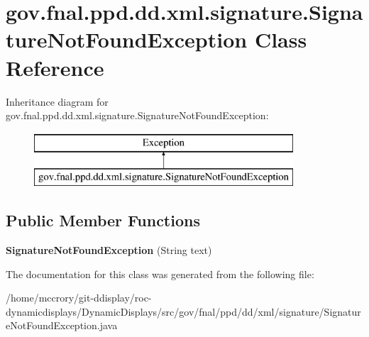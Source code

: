 \hypertarget{classgov_1_1fnal_1_1ppd_1_1dd_1_1xml_1_1signature_1_1SignatureNotFoundException}{\section{gov.\-fnal.\-ppd.\-dd.\-xml.\-signature.\-Signature\-Not\-Found\-Exception Class Reference}
\label{classgov_1_1fnal_1_1ppd_1_1dd_1_1xml_1_1signature_1_1SignatureNotFoundException}
}
Inheritance diagram for gov.\-fnal.\-ppd.\-dd.\-xml.\-signature.\-Signature\-Not\-Found\-Exception\-:\begin{figure}[H]
\begin{center}
\leavevmode
\includegraphics[height=2.000000cm]{classgov_1_1fnal_1_1ppd_1_1dd_1_1xml_1_1signature_1_1SignatureNotFoundException}
\end{center}
\end{figure}
\subsection*{Public Member Functions}
\begin{DoxyCompactItemize}
\item 
\hypertarget{classgov_1_1fnal_1_1ppd_1_1dd_1_1xml_1_1signature_1_1SignatureNotFoundException_af80eae7d40d4d237e1f236753ce468e5}{{\bfseries Signature\-Not\-Found\-Exception} (String text)}\label{classgov_1_1fnal_1_1ppd_1_1dd_1_1xml_1_1signature_1_1SignatureNotFoundException_af80eae7d40d4d237e1f236753ce468e5}

\end{DoxyCompactItemize}


The documentation for this class was generated from the following file\-:\begin{DoxyCompactItemize}
\item 
/home/mccrory/git-\/ddisplay/roc-\/dynamicdisplays/\-Dynamic\-Displays/src/gov/fnal/ppd/dd/xml/signature/Signature\-Not\-Found\-Exception.\-java\end{DoxyCompactItemize}

